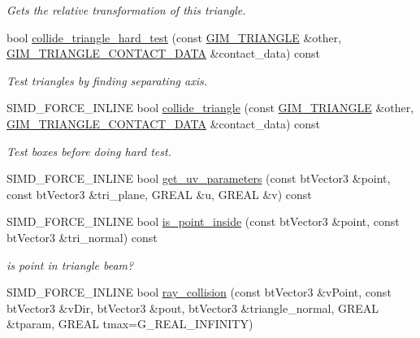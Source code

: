 \begin{DoxyCompactItemize}
\begin{DoxyCompactList}\small\item\em Gets the relative transformation of this triangle. \end{DoxyCompactList}\item 
bool \hyperlink{classGIM__TRIANGLE_a60a6a90dccfd5f81663088847fbfae34}{collide\+\_\+triangle\+\_\+hard\+\_\+test} (const \hyperlink{classGIM__TRIANGLE}{G\+I\+M\+\_\+\+T\+R\+I\+A\+N\+G\+LE} \&other, \hyperlink{structGIM__TRIANGLE__CONTACT__DATA}{G\+I\+M\+\_\+\+T\+R\+I\+A\+N\+G\+L\+E\+\_\+\+C\+O\+N\+T\+A\+C\+T\+\_\+\+D\+A\+TA} \&contact\+\_\+data) const
\begin{DoxyCompactList}\small\item\em Test triangles by finding separating axis. \end{DoxyCompactList}\item 
S\+I\+M\+D\+\_\+\+F\+O\+R\+C\+E\+\_\+\+I\+N\+L\+I\+NE bool \hyperlink{classGIM__TRIANGLE_ac8930de461fb35af599d7a28d0a02229}{collide\+\_\+triangle} (const \hyperlink{classGIM__TRIANGLE}{G\+I\+M\+\_\+\+T\+R\+I\+A\+N\+G\+LE} \&other, \hyperlink{structGIM__TRIANGLE__CONTACT__DATA}{G\+I\+M\+\_\+\+T\+R\+I\+A\+N\+G\+L\+E\+\_\+\+C\+O\+N\+T\+A\+C\+T\+\_\+\+D\+A\+TA} \&contact\+\_\+data) const
\begin{DoxyCompactList}\small\item\em Test boxes before doing hard test. \end{DoxyCompactList}\item 
S\+I\+M\+D\+\_\+\+F\+O\+R\+C\+E\+\_\+\+I\+N\+L\+I\+NE bool \hyperlink{classGIM__TRIANGLE_aa35a00f5c7b9eeb8f0656be929294504}{get\+\_\+uv\+\_\+parameters} (const bt\+Vector3 \&point, const bt\+Vector3 \&tri\+\_\+plane, G\+R\+E\+AL \&u, G\+R\+E\+AL \&v) const
\item 
S\+I\+M\+D\+\_\+\+F\+O\+R\+C\+E\+\_\+\+I\+N\+L\+I\+NE bool \hyperlink{classGIM__TRIANGLE_ac465430340164aa45925762d3471b5f8}{is\+\_\+point\+\_\+inside} (const bt\+Vector3 \&point, const bt\+Vector3 \&tri\+\_\+normal) const
\begin{DoxyCompactList}\small\item\em is point in triangle beam? \end{DoxyCompactList}\item 
\mbox{\label{classGIM__TRIANGLE_a2942ca686a994c2d112ad356c2a4e7ad}} 
S\+I\+M\+D\+\_\+\+F\+O\+R\+C\+E\+\_\+\+I\+N\+L\+I\+NE bool \hyperlink{classGIM__TRIANGLE_a2942ca686a994c2d112ad356c2a4e7ad}{ray\+\_\+collision} (const bt\+Vector3 \&v\+Point, const bt\+Vector3 \&v\+Dir, bt\+Vector3 \&pout, bt\+Vector3 \&triangle\+\_\+normal, G\+R\+E\+AL \&tparam, G\+R\+E\+AL tmax=G\+\_\+\+R\+E\+A\+L\+\_\+\+I\+N\+F\+I\+N\+I\+TY)

\end{DoxyCompactItemize}
